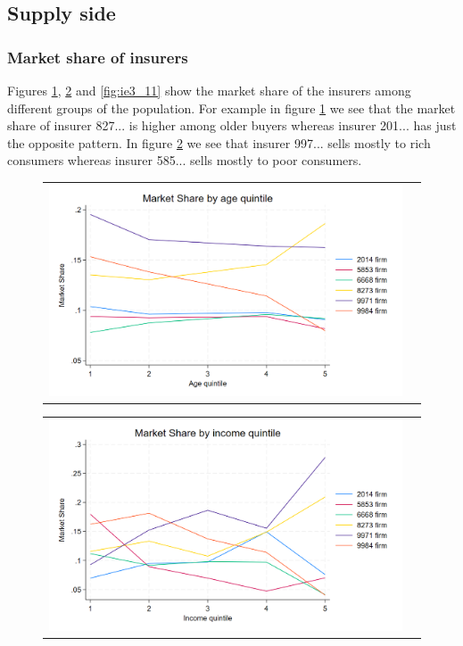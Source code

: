 \documentclass[12pt]{article}
\begin{document}
\subsection{Supply side}

\subsubsection{Market share of insurers}
Figures \ref{fig:ie3_9}, \ref{fig:ie3_10} and \ref{fig:ie3_11} show the market share of the insurers among different groups of the population. 
For example in figure \ref{fig:ie3_9} we see that the market share of insurer 827... is higher among older buyers whereas insurer 201... has just the opposite pattern. 
In figure \ref{fig:ie3_10} we see that insurer 997... sells mostly to rich consumers whereas insurer 585... sells mostly to poor consumers. 


\begin{figure}[H]
\caption{}
\label{fig:ie3_9}
\centering{}%
\begin{tabular}{cc}
\includegraphics[scale=0.27]{figures/IE3_supply_age_quintile.png}
\end{tabular}
\end{figure}

\begin{figure}[H]
\caption{}
\label{fig:ie3_10}
\centering{}%
\begin{tabular}{cc}
\includegraphics[scale=0.27]{figures/IE3_supply_income_quintile.png}
\end{tabular}
\end{figure}
\end{document}
